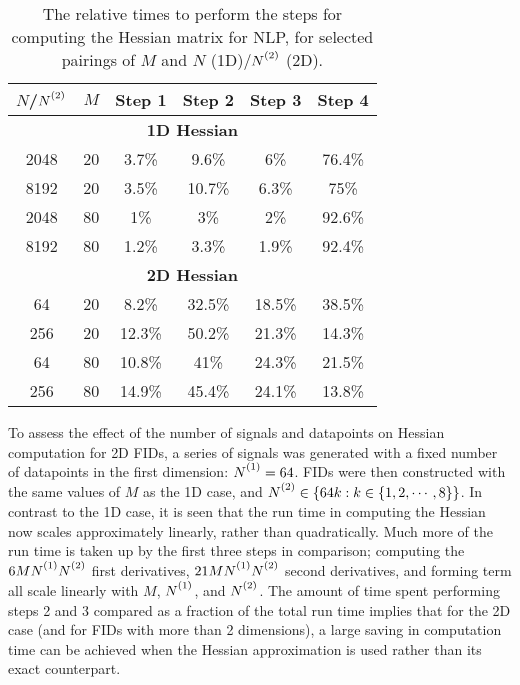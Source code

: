 \begin{table}
    \begin{center}
        \begin{tabular}{ c c c c c c }
            \toprule
            $N$/$\Ntwo$ &
            $M$ &
            Step 1 &
            Step 2 &
            Step 3 &
            Step 4 \\
            \midrule
            \multicolumn{6}{c}{\textbf{1D Hessian}}\\
            \midrule
            2048 & 20 & 3.7\% & 9.6\% & 6\% & 76.4\% \\
            8192 & 20 & 3.5\% & 10.7\% & 6.3\% & 75\% \\
            2048 & 80 & 1\% & 3\% & 2\% & 92.6\% \\
            8192 & 80 & 1.2\% & 3.3\% & 1.9\% & 92.4\% \\
            \midrule
            \multicolumn{6}{c}{\textbf{2D Hessian}}\\
            \midrule
            64 & 20 & 8.2\% & 32.5\% & 18.5\% & 38.5\% \\
            256 & 20 & 12.3\% & 50.2\% & 21.3\% & 14.3\% \\
            64 & 80 & 10.8\% & 41\% & 24.3\% & 21.5\% \\
            256 & 80 & 14.9\% & 45.4\% & 24.1\% & 13.8\% \\
            \bottomrule
        \end{tabular}
    \end{center}
    \caption[
        The relative times to perform the steps for computing the Hessian
        matrix for \acs{NLP}.
    ]{
        The relative times to perform the steps for computing the Hessian
        matrix for \acs{NLP}, for selected pairings of $M$ and $N$
        (\ac{1D})/$\Ntwo$ (\ac{2D}).
    }
    \label{tab:hess-steps}
\end{table}

To assess the effect of the number of signals and datapoints on Hessian
computation for \ac{2D} \acp{FID}, a series of signals was generated with a
fixed number of datapoints in the first dimension: $\None = 64$. \acp{FID} were
then constructed with the same values of $M$ as the \ac{1D} case, and $\Ntwo
\in \lbrace 64k : k \in \lbrace 1, 2, \cdots, 8 \rbrace \rbrace$. In contrast to
the \ac{1D} case, it is seen that the run time in computing the Hessian now
scales approximately linearly, rather than quadratically. Much more of the run
time is taken up by the first three steps in comparison; computing the
$6M\None\Ntwo$ first derivatives, $21M\None\Ntwo$ second derivatives, and
forming term  all scale linearly with $M$, $\None$, and $\Ntwo$. The
amount of time spent performing steps 2 and 3 compared as a fraction of the
total run time implies that for
the \ac{2D} case (and for \acp{FID} with more than 2 dimensions), a large saving
in computation time can be achieved when the Hessian approximation
is used rather than its exact counterpart.


